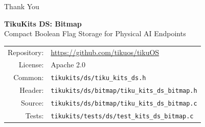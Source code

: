\documentclass[aspectratio=169, 10pt]{beamer}
\begin{document}
\begin{frame}{Thank You}
\begin{center}
\Large\textbf{TikuKits DS: Bitmap}\\[0.5em]
\normalsize Compact Boolean Flag Storage for Physical AI Endpoints\\[1.5em]

\begin{tabular}{rl}
  Repository: & \url{https://github.com/tikuos/tikuOS} \\
  License:    & Apache 2.0 \\
  Common:     & \texttt{tikukits/ds/tiku\_kits\_ds.h} \\
  Header:     & \texttt{tikukits/ds/bitmap/tiku\_kits\_ds\_bitmap.h} \\
  Source:     & \texttt{tikukits/ds/bitmap/tiku\_kits\_ds\_bitmap.c} \\
  Tests:      & \texttt{tikukits/tests/ds/test\_kits\_ds\_bitmap.c} \\
\end{tabular}
\end{center}
\end{frame}
\end{document}
